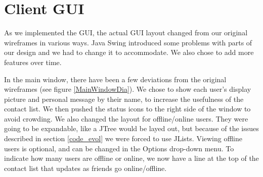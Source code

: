 \section{Client GUI}
\label{guiimpl}

As we implemented the GUI, the actual GUI layout changed from our original wireframes in various ways. Java Swing introduced some problems with parts of our design and we had to change it to accommodate. We also chose to add more features over time.

In the main window, there have been a few deviations from the original wireframes (see figure \ref{MainWindowDia}). We chose to show each user's display picture and personal message by their name, to increase the usefulness of the contact list. We then pushed the status icons to the right side of the window to avoid crowding. We also changed the layout for offline/online users. They were going to be expandable, like a JTree would be layed out, but because of the issues described in section \ref{code_evol} we were forced to use JLists. Viewing offline users is optional, and can be changed in the Options drop-down menu. To indicate how many users are offline or online, we now have a line at the top of the contact list that updates as friends go online/offline.

